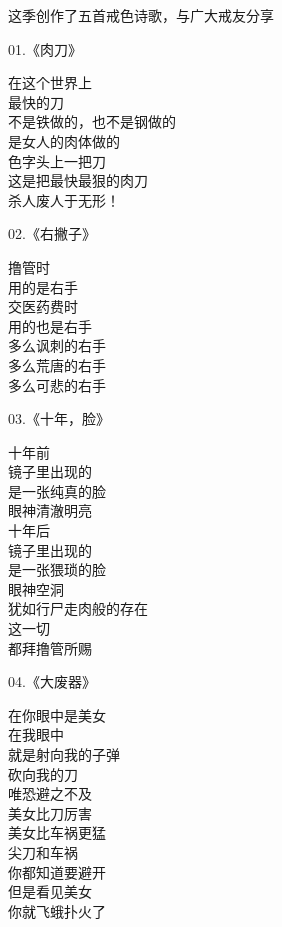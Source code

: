 这季创作了五首戒色诗歌，与广大戒友分享

\begin{multicols}{2}
    \begin{center}
        01.《肉刀》\it

        在这个世界上 \\ 最快的刀 \\ 不是铁做的，也不是钢做的 \\ 是女人的肉体做的 \\ 色字头上一把刀 \\ 这是把最快最狠的肉刀 \\ 杀人废人于无形！
    \end{center}

    \begin{center}
        02.《右撇子》\it

        撸管时 \\ 用的是右手 \\ 交医药费时 \\ 用的也是右手 \\ 多么讽刺的右手 \\ 多么荒唐的右手 \\ 多么可悲的右手
    \end{center}

    \begin{center}
        03.《十年，脸》\it

        十年前 \\ 镜子里出现的 \\ 是一张纯真的脸 \\ 眼神清澈明亮 \\ 十年后 \\ 镜子里出现的 \\ 是一张猥琐的脸 \\ 眼神空洞 \\ 犹如行尸走肉般的存在 \\ 这一切 \\ 都拜撸管所赐
    \end{center}

    \begin{center}
        04.《大废器》\it

        在你眼中是美女 \\ 在我眼中 \\ 就是射向我的子弹 \\ 砍向我的刀 \\ 唯恐避之不及 \\ 美女比刀厉害 \\ 美女比车祸更猛 \\ 尖刀和车祸 \\ 你都知道要避开 \\ 但是看见美女 \\ 你就飞蛾扑火了
    \end{center}


\end{multicols}
